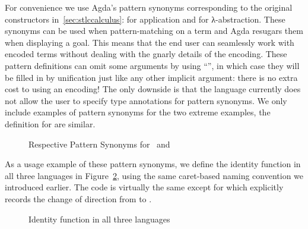 For convenience we use Agda's pattern synonyms corresponding to the
original constructors in~\cref{sec:stlccalculus}:
 for application and  for λ-abstraction. These
synonyms can be used when pattern-matching on a term and Agda resugars
them when displaying a goal. This means that the end user can
seamlessly work with encoded terms without dealing with the gnarly
details of the encoding.  These pattern definitions can omit some
arguments by using ``\AS{\_}'', in which case they will be filled in
by unification just like any other implicit argument: there is no
extra cost to using an encoding!  The only downside is that the
language currently does not allow the user to specify type annotations
for pattern synonyms. We only include examples of pattern synonyms
for the two extreme examples, the definition for  are similar.

\begin{figure}[h]
  \begin{AgdaSuppressSpace}
  \end{AgdaSuppressSpace}
  \caption{Respective Pattern Synonyms for ~and %
    \label{fig:patsLC}}
\end{figure}

As a usage example of these pattern synonyms, we define the identity
function in all three languages in Figure~\ref{fig:identity}, using the
same caret-based naming convention we introduced earlier. The code
is virtually the same except for  which explicitly records
the change of direction from  to .

\begin{figure}[h]
\begin{minipage}{0.25\textwidth}
\end{minipage}\hfill
\begin{minipage}{0.35\textwidth}
\end{minipage}\hfill
\begin{minipage}{0.30\textwidth}
\end{minipage}
\caption{Identity function in all three languages}\label{fig:identity}
\end{figure}

